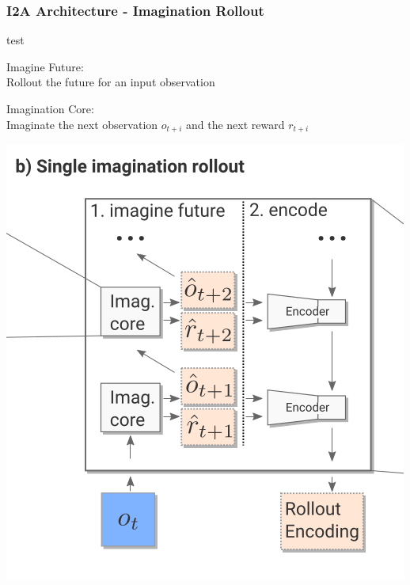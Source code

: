 \begin{frame}
    \frametitle{I2A Architecture - Imagination Rollout}

test
\begin{multicols}{2}
	\begin{PraesentationAufzaehlung}
		\item Imagine Future:\\
		Rollout the future for an input observation
	    \item Imagination Core:\\
		Imaginate the next observation $o_{t+i}$ and the next reward $r_{t+i}$
	\end{PraesentationAufzaehlung}
    \vfill\columnbreak
    \includegraphics[width=\columnwidth]{./Images/single_imagination_rollout.png}%
\end{multicols}
    
\end{frame}
\clearpage

